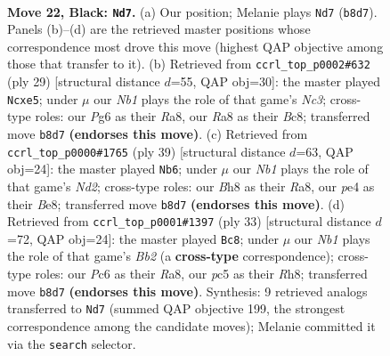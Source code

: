 \documentclass[11pt]{article}
\begin{document}
\clearpage

\begin{figure}[p]\centering
\begin{subfigure}{0.46\textwidth}\centering
\resizebox{\linewidth}{!}{%
\newchessgame
\chessboard[
  setfen={rn1r1knb/p4p1p/P1p3p1/2P1p3/4P2P/5P2/4N1B1/R1B2RK1 b - - 0 22},
  showmover=false,
  pgfstyle=straightmove, color=movearrow, markmove={b8-d7}
]}
\caption{}
\end{subfigure}\hfill
\begin{subfigure}{0.46\textwidth}\centering
\resizebox{\linewidth}{!}{%
\newchessgame
\chessboard[
  setfen={r1b1k2r/1p1n1ppp/p1n1p3/2p1P3/2P5/2N1P3/PB1RB1PP/R5K1 b kq - 4 15},
  showmover=false,
  pgfstyle=straightmove, color=movearrow, markmove={c6-e5}
]}
\caption{}
\end{subfigure}
\\[4pt]
\begin{subfigure}{0.46\textwidth}\centering
\resizebox{\linewidth}{!}{%
\newchessgame
\chessboard[
  setfen={r2rb1k1/1p1n1ppp/p2Bp3/4P3/PPp2PPP/2N5/8/2KR2R1 b - - 0 20},
  showmover=false,
  pgfstyle=straightmove, color=movearrow, markmove={d7-b6}
]}
\caption{}
\end{subfigure}\hfill
\begin{subfigure}{0.46\textwidth}\centering
\resizebox{\linewidth}{!}{%
\newchessgame
\chessboard[
  setfen={r3k2r/pbp2npp/1p1p4/n2P4/P2NP3/2PB2P1/4K2P/R1B4R b kq - 0 17},
  showmover=false,
  pgfstyle=straightmove, color=movearrow, markmove={b7-c8}
]}
\caption{}
\end{subfigure}
\caption{\textbf{Move 22, Black: \texttt{Nd7}.} (a) Our position; Melanie plays \texttt{Nd7} (\texttt{b8d7}). Panels (b)--(d) are the retrieved master positions whose correspondence most drove this move (highest QAP objective among those that transfer to it). (b) Retrieved from \texttt{ccrl\_top\_p0002\#632} (ply 29) [structural distance $d$=55, QAP obj=30]: the master played \texttt{Ncxe5}; under $\mu$ our \emph{Nb1} plays the role of that game's \emph{Nc3}; cross-type roles: our \emph{P}g6 as their \emph{R}a8, our \emph{R}a8 as their \emph{B}c8; transferred move \texttt{b8d7} \textbf{(endorses this move)}. (c) Retrieved from \texttt{ccrl\_top\_p0000\#1765} (ply 39) [structural distance $d$=63, QAP obj=24]: the master played \texttt{Nb6}; under $\mu$ our \emph{Nb1} plays the role of that game's \emph{Nd2}; cross-type roles: our \emph{B}h8 as their \emph{R}a8, our \emph{p}e4 as their \emph{B}e8; transferred move \texttt{b8d7} \textbf{(endorses this move)}. (d) Retrieved from \texttt{ccrl\_top\_p0001\#1397} (ply 33) [structural distance $d$=72, QAP obj=24]: the master played \texttt{Bc8}; under $\mu$ our \emph{Nb1} plays the role of that game's \emph{Bb2} (a \textbf{cross-type} correspondence); cross-type roles: our \emph{P}c6 as their \emph{R}a8, our \emph{p}c5 as their \emph{R}h8; transferred move \texttt{b8d7} \textbf{(endorses this move)}. Synthesis: 9 retrieved analogs transferred to \texttt{Nd7} (summed QAP objective 199, the strongest correspondence among the candidate moves); Melanie committed it via the \texttt{search} selector.}
\label{fig:thought-m43}
\end{figure}
\end{document}
